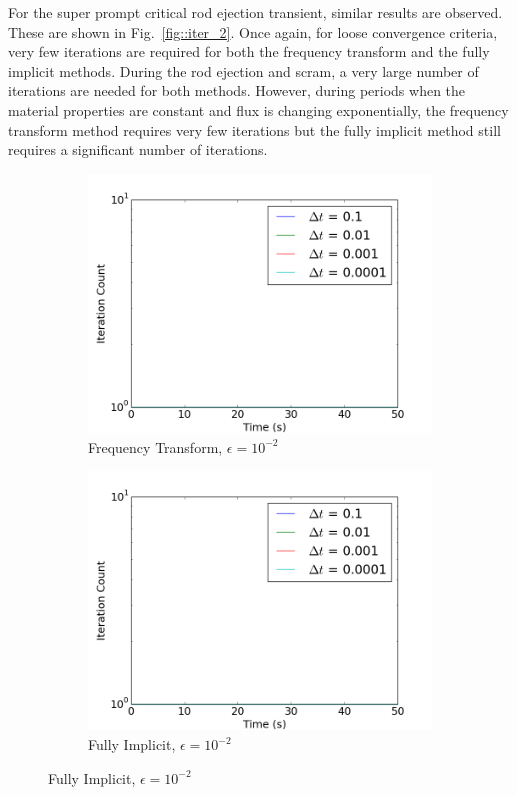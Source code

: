 \documentclass[12pt]{report}
\begin{document}
For the super prompt critical rod ejection transient, similar results are observed. These are shown in Fig.~\ref{fig::iter_2}. Once again, for loose convergence criteria, very few iterations are required for both the frequency transform and the fully implicit methods. During the rod ejection and scram, a very large number of iterations are needed for both methods. However, during periods when the material properties are constant and flux is changing exponentially, the frequency transform method requires very few iterations but the fully implicit method still requires a significant number of iterations.
		\begin{figure}[ht]
			\centering
			\begin{subfigure}{.5\textwidth}
				\centering
				\includegraphics[width=.95\linewidth]{figs/iter_case1_conv1.png}
				\caption{Frequency Transform, $\epsilon = 10^{-2}$}
				\label{fig::iter_1_1_ft}
			\end{subfigure}%
			\begin{subfigure}{.5\textwidth}
				\centering
				\includegraphics[width=.95\linewidth]{figs/iter_case1_conv1_omega0.png}
				\caption{Fully Implicit, $\epsilon = 10^{-2}$}
				\label{fig::iter_1_1_fi}
			\end{subfigure}
			

\end{figure}
\end{document}
